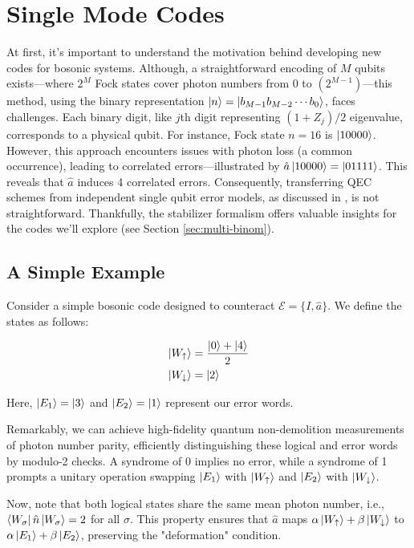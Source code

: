 \documentclass[11pt]{article}
\newcommand\0{\mathbf{0}}
\newcommand\<{\langle}
\renewcommand\>{\rangle}
\begin{document}
\section{Single Mode Codes}

At first, it's important to understand the motivation behind developing new codes for bosonic systems. Although, a straightforward encoding of \(M\) qubits exists---where \(2^M\) Fock states cover photon numbers from 0 to \((2^{M - 1})\)---this method, using the binary representation \(\ket{n} = \ket{b_{M-1} b_{M-2} \cdots b_0 }\), faces challenges. Each binary digit, like \(j\)th digit representing \((1 + Z_j)/2\) eigenvalue, corresponds to a physical qubit. For instance, Fock state \(n=16\) is \(\ket{10000}\). However, this approach encounters issues with photon loss (a common occurrence), leading to correlated errors---illustrated by \(\hat{a}\ket{10000} = \ket{01111}\). This reveals that \(\hat{a}\) induces 4 correlated errors. Consequently, transferring QEC schemes from independent single qubit error models, as discussed in \cite{michael2016new}, is not straightforward. Thankfully, the stabilizer formalism offers valuable insights for the codes we'll explore (see Section \ref{sec:multi-binom}).


\subsection{A Simple Example}
\label{sec:simple}

Consider a simple bosonic code designed to counteract $\mathcal{E} = \{ I, \hat{a} \}$. We define the states as follows:

\[
\begin{aligned}
\ket{W_\uparrow} &= \frac{\ket{0} + \ket{4}}{2} \\
\ket{W_\downarrow} &= \ket{2}
\end{aligned}
\]

Here, $\ket{E_1} = \ket{3}$ and $\ket{E_2} = \ket{1}$ represent our error words.

Remarkably, we can achieve high-fidelity quantum non-demolition measurements of photon number parity, efficiently distinguishing these logical and error words by modulo-2 checks. A syndrome of 0 implies no error, while a syndrome of 1 prompts a unitary operation swapping $\ket{E_1}$ with $\ket{W_\uparrow}$ and $\ket{E_2}$ with $\ket{W_\downarrow}$.

Now, note that both logical states share the same mean photon number, i.e., $\bra{W_\sigma} \hat{n} \ket{W_\sigma} = 2$ for all $\sigma$. This property ensures that $\hat{a}$ maps $\alpha\ket{W_\uparrow} + \beta\ket{W_\downarrow}$ to $\alpha \ket{E_1} + \beta \ket{E_2}$, preserving the "deformation" condition.
\end{document}
